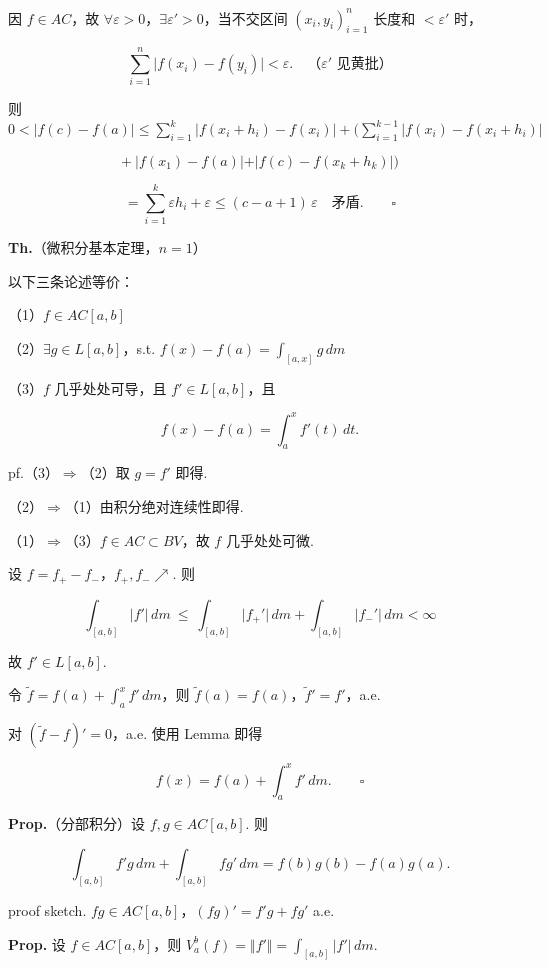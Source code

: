 \documentclass[11pt]{ctexart}
\theoremstyle{definition}
\begin{document}
因 $f \in AC$，故 $\forall \varepsilon > 0$，$\exists \varepsilon' > 0$，当不交区间 $(x_i, y_i)_{i=1}^{n}$ 长度和 $< \varepsilon'$ 时，

\[
\sum_{i=1}^{n} \vert f(x_i) - f(y_i)\vert < \varepsilon. \quad \text{（} \varepsilon' \text{ 见黄批）}
\]

则 $0 < \vert f(c) - f(a)\vert \leq \sum\limits_{i=1}^{k} \vert f(x_i + h_i) - f(x_i)\vert + \Big( \sum\limits_{i=1}^{k-1} \vert f(x_i) - f(x_i + h_i)\vert$

\[
+\ \vert f(x_1) - f(a)\vert + \vert f(c) - f(x_k + h_k)\vert \Big)
\]

\[
= \sum_{i=1}^{k} \varepsilon h_i + \varepsilon \leq (c - a + 1)\,\varepsilon \quad \text{矛盾}. \qquad \square
\]

\textbf{Th.}（微积分基本定理，$n = 1$）

以下三条论述等价：

（1）$f \in AC[a,b]$

（2）$\exists g \in L[a,b]$，s.t. $f(x) - f(a) = \displaystyle\int_{[a,x]} g \, dm$

（3）$f$ 几乎处处可导，且 $f' \in L[a,b]$，且

\[
f(x) - f(a) = \int_a^x f'(t)\, dt.
\]

pf.（3）$\Rightarrow$（2）取 $g = f'$ 即得.

（2）$\Rightarrow$（1）由积分绝对连续性即得.

（1）$\Rightarrow$（3）$f \in AC \subset BV$，故 $f$ 几乎处处可微.

设 $f = f_+ - f_-$，$f_+, f_- \nearrow$. 则

\[
\int_{[a,b]} \vert f'\vert \, dm \ \leq\ \int_{[a,b]} \vert f_+'\vert \, dm + \int_{[a,b]} \vert f_-'\vert \, dm < \infty
\]

故 $f' \in L[a,b]$.

令 $\widetilde{f} = f(a) + \displaystyle\int_a^x f' \, dm$，则 $\widetilde{f}(a) = f(a)$，$\widetilde{f}' = f'$，a.e.

对 $(\widetilde{f} - f)' = 0$，a.e. 使用 Lemma 即得

\[
f(x) = f(a) + \int_a^x f' \, dm. \qquad \square
\]

\textbf{Prop.}（分部积分）设 $f, g \in AC[a,b]$. 则

\[
\int_{[a,b]} f'g \, dm + \int_{[a,b]} fg' \, dm = f(b)g(b) - f(a)g(a).
\]

proof sketch. $fg \in AC[a,b]$，$(fg)' = f'g + fg'$  a.e.

\textbf{Prop.} 设 $f \in AC[a,b]$，则 $V_a^b(f) = \Vert f'\Vert = \displaystyle\int_{[a,b]} \vert f'\vert \, dm$.
\end{document}
